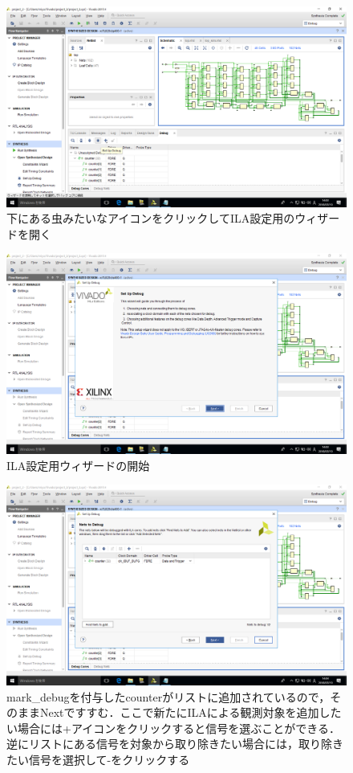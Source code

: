 \documentclass[a4paper,dvipdfmx]{jsarticle}
\begin{document}
 \begin{figure}[H]
  \begin{center}
   \includegraphics[width=.8\textwidth]{chapter05_figures/VirtualBox_Windows10_19_03_2018_14_03_43.png}
  \end{center}
  \caption{下にある虫みたいなアイコンをクリックしてILA設定用のウィザードを開く}
 \end{figure}

 \begin{figure}[H]
  \begin{center}
   \includegraphics[width=.8\textwidth]{chapter05_figures/VirtualBox_Windows10_19_03_2018_14_03_58.png}
  \end{center}
  \caption{ILA設定用ウィザードの開始}
 \end{figure}

 \begin{figure}[H]
  \begin{center}
   \includegraphics[width=.8\textwidth]{chapter05_figures/VirtualBox_Windows10_19_03_2018_14_04_03.png}
  \end{center}
  \caption{mark\_debugを付与したcounterがリストに追加されているので，そのままNextですすむ．ここで新たにILAによる観測対象を追加したい場合には+アイコンをクリックすると信号を選ぶことができる．逆にリストにある信号を対象から取り除きたい場合には，取り除きたい信号を選択して-をクリックする}
 \end{figure}
\end{document}
